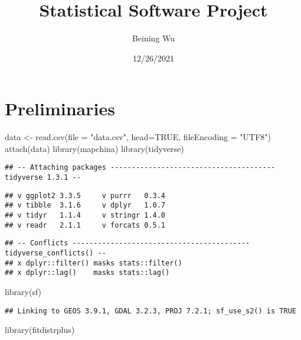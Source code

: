\documentclass[
]{article}
\title{Statistical Software Project}
\author{Beining Wu}
\date{12/26/2021}
\newenvironment{Shaded}{\begin{snugshade}}{\end{snugshade}}
\newcommand{\AttributeTok}[1]{\textcolor[rgb]{0.77,0.63,0.00}{#1}}
\newcommand{\ConstantTok}[1]{\textcolor[rgb]{0.00,0.00,0.00}{#1}}
\newcommand{\FunctionTok}[1]{\textcolor[rgb]{0.00,0.00,0.00}{#1}}
\newcommand{\NormalTok}[1]{#1}
\newcommand{\OtherTok}[1]{\textcolor[rgb]{0.56,0.35,0.01}{#1}}
\newcommand{\StringTok}[1]{\textcolor[rgb]{0.31,0.60,0.02}{#1}}
\begin{document}
\maketitle

{
\setcounter{tocdepth}{2}
\tableofcontents
}
\hypertarget{preliminaries}{%
\section{Preliminaries}\label{preliminaries}}

\begin{Shaded}
\begin{Highlighting}[]
\NormalTok{data }\OtherTok{\textless{}{-}} \FunctionTok{read.csv}\NormalTok{(}\AttributeTok{file =} \StringTok{"data.csv"}\NormalTok{, }\AttributeTok{head=}\ConstantTok{TRUE}\NormalTok{, }\AttributeTok{fileEncoding =} \StringTok{"UTF8"}\NormalTok{)}
\FunctionTok{attach}\NormalTok{(data)}
\FunctionTok{library}\NormalTok{(mapchina)}
\FunctionTok{library}\NormalTok{(tidyverse)}
\end{Highlighting}
\end{Shaded}

\begin{verbatim}
## -- Attaching packages --------------------------------------- tidyverse 1.3.1 --
\end{verbatim}

\begin{verbatim}
## v ggplot2 3.3.5     v purrr   0.3.4
## v tibble  3.1.6     v dplyr   1.0.7
## v tidyr   1.1.4     v stringr 1.4.0
## v readr   2.1.1     v forcats 0.5.1
\end{verbatim}

\begin{verbatim}
## -- Conflicts ------------------------------------------ tidyverse_conflicts() --
## x dplyr::filter() masks stats::filter()
## x dplyr::lag()    masks stats::lag()
\end{verbatim}

\begin{Shaded}
\begin{Highlighting}[]
\FunctionTok{library}\NormalTok{(sf)}
\end{Highlighting}
\end{Shaded}

\begin{verbatim}
## Linking to GEOS 3.9.1, GDAL 3.2.3, PROJ 7.2.1; sf_use_s2() is TRUE
\end{verbatim}

\begin{Shaded}
\begin{Highlighting}[]
\FunctionTok{library}\NormalTok{(fitdistrplus)}
\end{Highlighting}
\end{Shaded}
\end{document}
